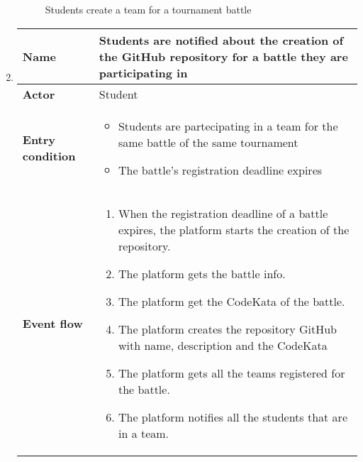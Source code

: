 \begin{enumerate}[label=\textbf{UC\arabic*}:,leftmargin=1.3cm]
            \begin{figure}[H]
                  \centering
                  \caption{Students create a team for a tournament battle}
                  \label{fig:Students create a team for a tournament battle}
            \end{figure}
            \pagebreak
      \item \textbf{}
            \begin{table}[H]
                  \centering
                  \begin{tabular}{|l|p{11.9cm}|}
                        \hline
                        \textbf{Name}            & Students are notified about the creation of the GitHub repository for a battle they are participating in \\\hline
                        \textbf{Actor}           & Student                                                                                                  \\\hline
                        \textbf{Entry condition} &
                        \begin{itemize}
                              \item Students are partecipating in a team for the same battle of the same tournament
                              \item The battle's registration deadline expires
                        \end{itemize}                                                \\\hline
                        \textbf{Event flow}      &
                        \begin{enumerate}[label=\arabic*.]
                              \item When the registration deadline of a battle expires, the platform starts the creation of the repository.
                              \item The platform gets the battle info.
                              \item The platform get the CodeKata of the battle.
                              \item The platform creates the repository GitHub with name, description and the CodeKata
                              \item The platform gets all the teams registered for the battle.
                              \item The platform notifies all the students that are in a team.

\end{enumerate}
\end{tabular}
\end{table}
\end{enumerate}
